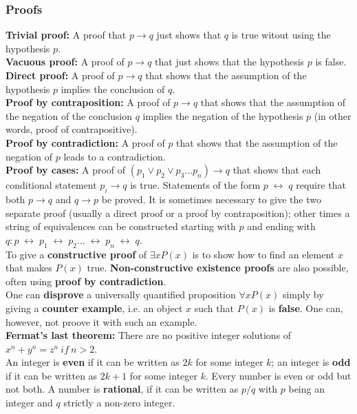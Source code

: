 \documentclass[12pt]{article}
\renewcommand{\iff}{\;\leftrightarrow\;}
\begin{document}
\subsubsection{Proofs} 
\bigskip
\textbf{Trivial proof:} A proof that $p \rightarrow q$ just shows that $q$ is true witout using the hypothesis $p$. \\
\textbf{Vacuous proof:} A proof of $p \rightarrow q$ that just shows that the hypothesis $p$ is false. \\
\textbf{Direct proof:} A proof of $p \rightarrow q$ that shows that the assumption of the hypothesis $p$ implies the conclusion of $q$. \\
\textbf{Proof by contraposition:} A proof of $p \rightarrow q$ that shows that the assumption of the negation of the conclusion $q$ implies the negation of the hypothesis $p$ (in other words, proof of contrapositive).\\
\textbf{Proof by contradiction:} A proof of $p$ that shows that the assumption of the negation of $p$ leads to a contradiction. \\
\textbf{Proof by cases:} A proof of $(p_1 \vee p_2 \vee p_3 ... p_n) \rightarrow q$ that shows that each conditional statement $p_i \rightarrow q$ is true. Statements of the form $p \iff q$ require that both $p \rightarrow q$ and $q \rightarrow p$ be proved. It is sometimes necessary to give the two separate proof (usually a direct proof or a proof by contraposition); other times a string of equivalences can be constructed starting with $p$ and ending with $q : p \iff p_1 \iff p_2 ... \iff p_n \iff q$. \\
To give a \textbf{constructive proof} of $\exists x P(x)$ is to show how to find an element $x$ that makes $P(x)$ true. \textbf{Non-constructive existence proofs} are also possible, often using \textbf{proof by contradiction}. \\
One can \textbf{disprove} a universally quantified proposition $\forall x P(x)$ simply by giving a \textbf{counter example}, i.e. an object $x$ such that $P(x)$ is \textbf{false}. One can, however, not proove it with such an example. \\
\medskip
\textbf{Fermat's last theorem:} There are no positive integer solutions of $x^n + y^n = z^n\ if\ n > 2$. \\
An integer is \textbf{even} if it can be written as $2k$ for some integer $k$; an integer is \textbf{odd} if it can be written as $2k + 1$ for some integer $k$. Every number is even or odd but not both. A number is \textbf{rational}, if it can be written as $p/q$ with $p$ being an integer and $q$ strictly a non-zero integer. \\

 
\end{document}
